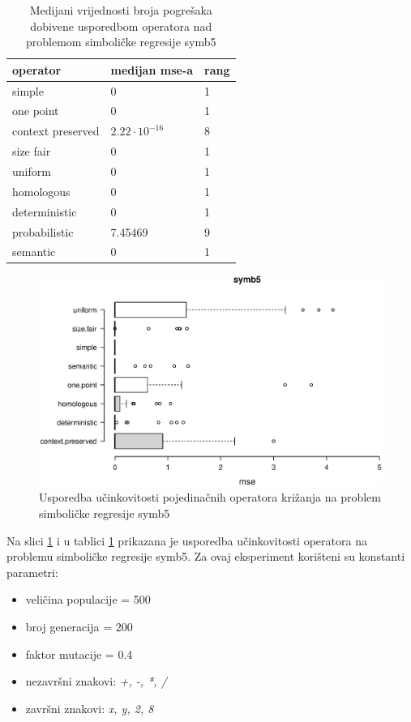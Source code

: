 \begin{table}[H]
 	\centering
 \caption{Medijani vrijednosti broja pogrešaka dobivene usporedbom operatora nad problemom simboličke regresije symb5}
 
    \begin{tabular}{| l | l | l |}
    \hline
    \textbf{operator} & \textbf{medijan mse-a} & \textbf{rang}\\ \hline
    simple & 0 & 1\\ \hline
    one point & 0 & 1\\ \hline
    context preserved & $2.22 \cdot 10^{-16}$& 8\\ \hline
    size fair & 0 & 1\\ \hline
    uniform & 0 & 1\\ \hline
    homologous & 0 & 1\\ \hline
    deterministic & 0 & 1\\ \hline
    probabilistic & 7.45469 & 9\\ \hline
    semantic & 0 & 1\\ \hline
    \end{tabular}
    
   
    \label{symb5table}
\end{table}

\begin{figure}[H]
	\centering
	\includegraphics[trim=0cm 4cm 0cm 0cm, scale=0.6]{./slike/boxPlots/symb5.eps}
	\caption{Usporedba učinkovitosti pojedinačnih operatora križanja na problem simboličke regresije symb5}
	\label{symb5box}
\end{figure}


Na slici \ref{symb5box} i u tablici \ref{symb5table} prikazana je usporedba učinkovitosti operatora na problemu simboličke regresije symb5. Za ovaj eksperiment korišteni su konstanti parametri:
\begin{itemize}
\item{veličina populacije = 500}
\item{broj generacija = 200}
\item{faktor mutacije = 0.4}
\item{nezavršni znakovi: \textit{+, -, *, /}}
\item{završni znakovi: \textit{x, y, 2, 8}}
\end{itemize} 

